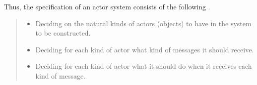 
Thus, the specification of an actor system consists of the following \citep{Hewitt1977a}.

\begin{quote}
\begin{itemize}
  \item Deciding on the natural kinds of actors (objects) to have in the system to be constructed.
  \item Deciding for each kind of actor what kind of messages it should receive.
  \item Deciding for each kind of actor what it should do when it receives each kind of message.
\end{itemize}
\end{quote}